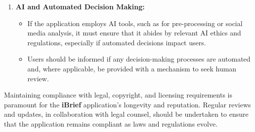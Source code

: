 \begin{enumerate}
    \item \textbf{AI and Automated Decision Making:}
    \begin{itemize}
        \item If the application employs AI tools, such as for pre-processing or social media analysis, it must ensure that it abides by relevant AI ethics and regulations, especially if automated decisions impact users.
        \item Users should be informed if any decision-making processes are automated and, where applicable, be provided with a mechanism to seek human review.
    \end{itemize}
\end{enumerate}

Maintaining compliance with legal, copyright, and licensing requirements is paramount for the \textbf{iBrief} application's longevity and reputation. Regular reviews and updates, in collaboration with legal counsel, should be undertaken to ensure that the application remains compliant as laws and regulations evolve.
